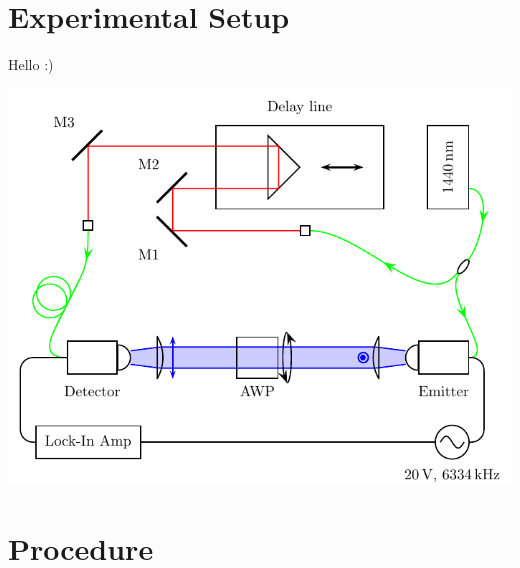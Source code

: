 \section{Experimental Setup}
Hello :) \cite{Scherger2011PaperPlatesb}

\includegraphics{images/4_chapter04/Setup1_TDS.pdf}

\section{Procedure}
